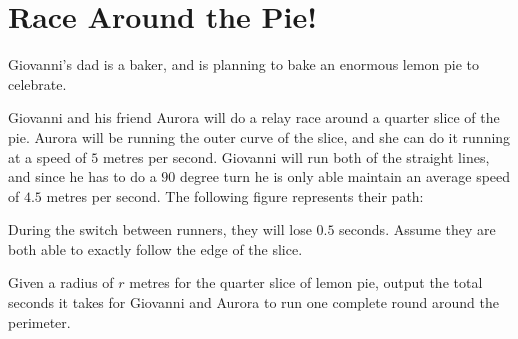 \documentclass{contest-set}
\begin{document}
\clearpage
\section{Race Around the Pie!}
Giovanni's dad is a baker, and is planning to bake an enormous lemon pie to celebrate. 

Giovanni and his friend Aurora will do a relay race around a quarter slice of the pie. Aurora will be running the outer curve of the slice, and she can do it running at a speed of $5$ metres per second. Giovanni will run both of the straight lines, and since he has to do a $90$ degree turn he is only able maintain an average speed of $4.5$ metres per second. The following figure represents their path:
\begin{figure}[h]
    \centering
\end{figure}

During the switch between runners, they will lose $0.5$ seconds. Assume they are both able to exactly follow the edge of the slice. 

Given a radius of $r$ metres for the quarter slice of lemon pie, output the total seconds it takes for Giovanni and Aurora to run one complete round around the perimeter.
\end{document}
